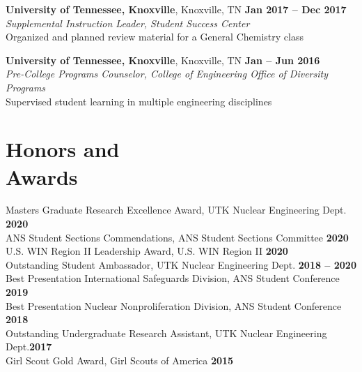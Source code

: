 \documentclass[margin,line]{resume}
\begin{document}
\begin{resume}
    \textbf{University of Tennessee, Knoxville}, Knoxville, TN \hfill \textbf{Jan 2017 -- Dec 2017}\\
                \textsl{Supplemental Instruction Leader, Student Success Center}\\
                Organized and planned review material for a General Chemistry class
                
    \textbf{University of Tennessee, Knoxville}, Knoxville, TN \hfill \textbf{Jan -- Jun 2016}\\
                \textsl{Pre-College Programs Counselor, College of Engineering Office of Diversity Programs}\\
                Supervised student learning in multiple engineering disciplines
    \section{\mysidestyle Honors and\\Awards}
                Masters Graduate Research Excellence Award, UTK Nuclear Engineering Dept. \hfill \textbf{2020}\vspace{.5mm}\\%
                ANS Student Sections Commendations, ANS Student Sections Committee \hfill \textbf{2020}\vspace{.5mm}\\%
                U.S. WIN Region II Leadership Award, U.S. WIN Region II \hfill \textbf{2020}\vspace{.5mm}\\%
                Outstanding Student Ambassador, UTK Nuclear Engineering Dept. \hfill \textbf{2018 -- 2020}\vspace{.5mm}\\%
                Best Presentation International Safeguards Division, ANS Student Conference \hfill \textbf{2019}\vspace{0.5mm}\\%
                Best Presentation Nuclear Nonproliferation Division, ANS Student Conference \hfill \textbf{2018}\vspace{0.5mm}\\%
                Outstanding Undergraduate Research Assistant, UTK Nuclear Engineering Dept.\hfill \textbf{2017}\vspace{.5mm}\\%
                Girl Scout Gold Award, Girl Scouts of America \hfill \textbf{2015}\vspace{.5mm}\\%


\end{resume}
\end{document}
